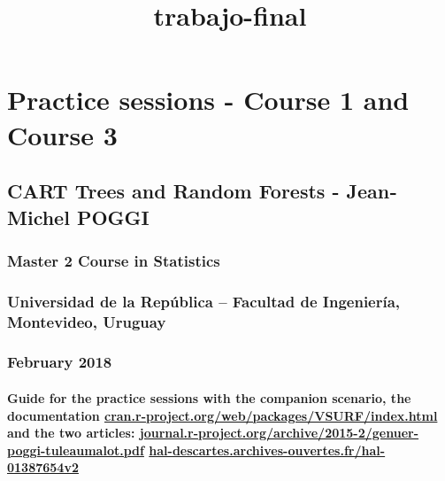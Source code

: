 \documentclass[11pt]{article}
\title{trabajo-final}
\begin{document}
    
    
    \maketitle
    
    

    
    \section{Practice sessions - Course 1 and Course
3}\label{practice-sessions---course-1-and-course-3}

\subsection{CART Trees and Random Forests - Jean‐Michel
POGGI}\label{cart-trees-and-random-forests---jeanmichel-poggi}

\subsubsection{Master 2 Course in
Statistics}\label{master-2-course-in-statistics}

\subsubsection{Universidad de la República -- Facultad de Ingeniería,
Montevideo,
Uruguay}\label{universidad-de-la-repuxfablica-facultad-de-ingenieruxeda-montevideo-uruguay}

\subsubsection{February 2018}\label{february-2018}

\paragraph{\texorpdfstring{Guide for the practice sessions with the
companion scenario, the documentation
\url{cran.r-project.org/web/packages/VSURF/index.html} and the two
articles:
\url{journal.r-project.org/archive/2015-2/genuer-poggi-tuleaumalot.pdf}
\url{hal-descartes.archives-ouvertes.fr/hal-01387654v2}}{Guide for the practice sessions with the companion scenario, the documentation cran.r-project.org/web/packages/VSURF/index.html and the two articles: journal.r-project.org/archive/2015-2/genuer-poggi-tuleaumalot.pdf hal-descartes.archives-ouvertes.fr/hal-01387654v2}}\label{guide-for-the-practice-sessions-with-the-companion-scenario-the-documentation-cran.r-project.orgwebpackagesvsurfindex.html-and-the-two-articles-journal.r-project.orgarchive2015-2genuer-poggi-tuleaumalot.pdf-hal-descartes.archives-ouvertes.frhal-01387654v2}
\end{document}
